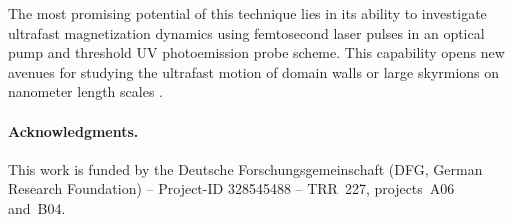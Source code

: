 \documentclass[prl,twocolumn,floatfix,superscriptaddress,aps]{revtex4-2}
\begin{document}
The most promising potential of this technique lies in its ability to investigate ultrafast magnetization dynamics using femtosecond laser pulses in an optical pump and threshold UV photoemission probe scheme. This capability opens new avenues for studying the ultrafast motion of domain walls \cite{parkin2008} or large skyrmions on nanometer length scales \cite{goebel2019,jani2021,kern2022}.

\paragraph{Acknowledgments.} This work is funded by the Deutsche Forschungsgemeinschaft (DFG, German Research Foundation) -- Project-ID 328545488 -- TRR~227, projects~A06 and~B04.

% 


\listoftodos
\end{document}
